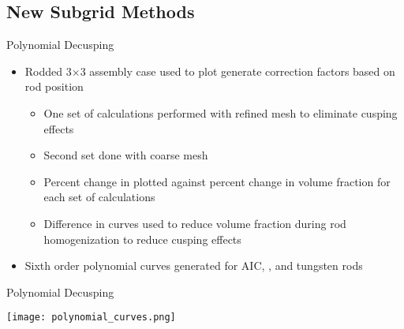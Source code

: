 \subsection{New Subgrid Methods}
\begin{frame}[t]{Polynomial Decusping}

\begin{itemize}
    \item Rodded 3$\times$3 assembly case used to plot generate correction factors based on rod position
    \begin{itemize}
        \item One set of calculations performed with refined mesh to eliminate cusping effects
        \item Second set done with coarse mesh
        \item Percent change in \keff{} plotted against percent change in volume fraction for each set of calculations
        \item Difference in curves used to reduce volume fraction during rod homogenization to reduce cusping effects
    \end{itemize}
    \item Sixth order polynomial curves generated for AIC, \bfc{}, and tungsten rods
\end{itemize}

\end{frame}


\begin{frame}[t]{Polynomial Decusping}
    
\begin{center}
    \texttt{[image: polynomial\_curves.png]}
\end{center}
    
\end{frame}


